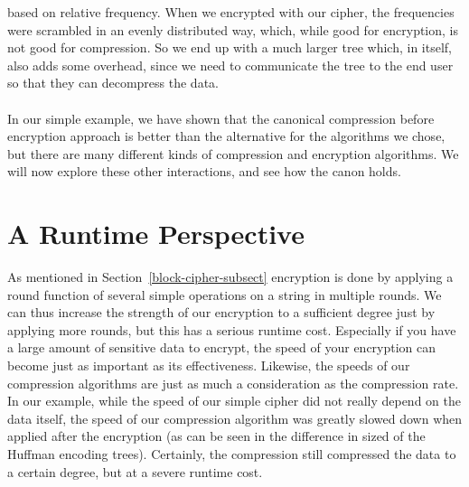 \documentclass[11pt]{article}
\newcommand\genref{}
\newcommand\sectref{}
\def\genref#1#2{#1~\ref{#2}}
\def\sectref#1{\genref{Section}{#1}}
\begin{document}
based on relative frequency. When we encrypted with our cipher, the frequencies were scrambled in an evenly distributed way, 
which, while good for encryption, is not good for compression. So we end up with a much larger tree which, in itself, also 
adds some overhead, since we need to communicate the tree to the end user so that they can decompress the data.\\\\
In our simple example, we have shown that the canonical compression before encryption approach is 
better than the alternative for the algorithms we chose, but there are many different kinds of compression and 
encryption algorithms. We will now explore these other interactions, and see how the canon holds. 

\section{A Runtime Perspective}\label{runtime-sect}
As mentioned in \sectref{block-cipher-subsect} encryption is done by applying a round function of several simple operations 
on a string in multiple rounds. We can thus increase the strength of our encryption to a sufficient degree just by 
applying more rounds, but this has a serious runtime cost. Especially if you have a large amount of sensitive data to 
encrypt, the speed of your encryption can become just as important as its effectiveness. Likewise, the speeds of our 
compression algorithms are just as much a consideration as the compression rate.\\
In our example, while the speed of our simple cipher did not really depend on the data itself, the speed of our 
compression algorithm was greatly slowed down when applied after the encryption (as can be seen in the difference in 
sized of the Huffman encoding trees). Certainly, the compression still compressed the data to a certain degree, but 
at a severe runtime cost.\\





% 
% 

\end{document}
